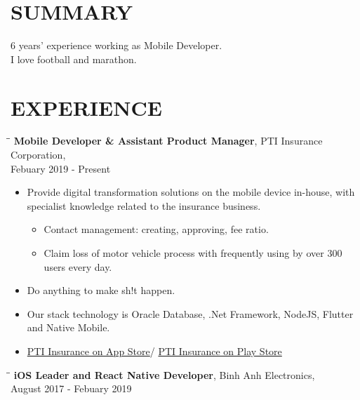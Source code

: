 \documentclass[margin, 10pt]{res}
\begin{document}
\begin{resume}
 
\section{SUMMARY}
   6 years' experience working as Mobile Developer.\\I love football and marathon.
 
\section{EXPERIENCE}
   \vspace{-0.1in}
   
   \begin{tabbing}
   \hspace{2.0in}\= \hspace{2.0in}\= \kill %
   {\bf Mobile Developer \& Assistant Product Manager}, PTI Insurance Corporation, \\Febuary 2019 - Present\\
   \end{tabbing}\vspace{-20pt} %

   \begin{itemize}
      \item Provide digital transformation solutions on the mobile device in-house, 
      with specialist knowledge related to the insurance business.
      \begin{itemize}
         \item  Contact management: creating, approving, fee ratio.
         \item  Claim loss of motor vehicle process with frequently using by over 300 users every day.
       \end{itemize}
		\item Do anything to make sh!t happen.
      \item Our stack technology is Oracle Database, .Net Framework, NodeJS, Flutter 
      and Native Mobile.
      \item {\color{blue}\href{https://apps.apple.com/us/developer/pti-insurance/id1253321255}{PTI Insurance on App Store}}/
      {\color{blue}\href{https://play.google.com/store/apps/developer?id=PTI+Insurance}{PTI Insurance on Play Store}}
   \end{itemize}   
      
   \begin{tabbing}
   \hspace{2.0in}\= \hspace{2.0in}\= \kill %
   {\bf iOS Leader and React Native Developer}, Binh Anh Electronics, \\August 2017 - Febuary 2019\\
   \end{tabbing}\vspace{-20pt} %


\end{resume}
\end{document}
